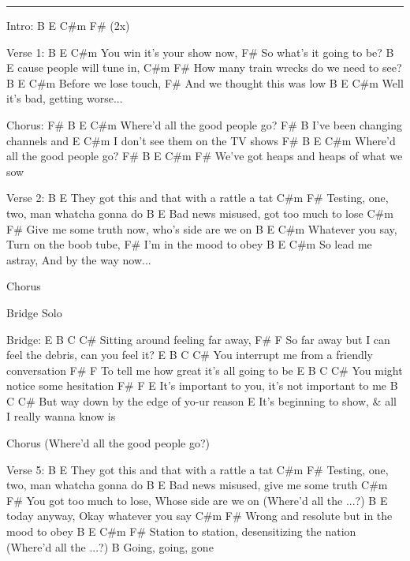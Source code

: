 \noindent\rule{\columnwidth}{1pt}

\begin{multicols}{2}
\begin{lstsong}
Intro: B  E C#m F# (2x)

Verse 1:
B        E             C#m
  You win it's your show now, 
   F#
So what's it going to be? 
B             E            
  cause people will tune in,
C#m                     F#
  How many train wrecks do we need to see? 
B       E          C#m
  Before we lose touch, 
    F#
And we thought this was low 
B           E              C#m  
  Well it's bad, getting worse...

Chorus:
F#                B       E    C#m
Where'd all the good people go?
            F#              B
I've been changing channels and
             E          C#m
I don't see them on the TV shows 
F#               B       E     C#m
Where'd all the good people go?
            F#                B   E C#m F# 
We've got heaps and heaps of what we sow 

Verse 2:
         B			E
They got this and that with a rattle a tat 
    C#m               F#
Testing, one, two, man whatcha gonna do 
    B		      E
Bad news misused, got too much to lose 
C#m			      F#
Give me some truth now, who's side are we on 
    B           E        C#m
Whatever you say, Turn on the boob tube,
F#
I'm in the mood to obey
    B           E            C#m
So lead me astray, And by the way now... 

Chorus

Bridge Solo

Bridge:
E                             B    C  C#
  Sitting around feeling far away,
        F#                          F   
So far away but I can feel the debris, can you feel it?
E                     B           C C#
 You interrupt me from a friendly conversation
           F#                             F
To tell me how great it's all going to be
E                   B         C C#
  You might notice some hesitation
                            F#            F E
It's important to you, it's not important to me
             B                          C C#
But way down by the edge of yo-ur reason
                          E
It's beginning to show, & all I really wanna know is

Chorus  (Where'd all the good people go?)


Verse 5:
         B			E
They got this and that with a rattle a tat 
    C#m               F#
Testing, one, two, man whatcha gonna do 
    B		   E
Bad news misused, give me some truth
        C#m			   F#                    
You got too much to lose,  Whose side are we on
                          (Where'd all the ...?)
   B                   E
today anyway, Okay whatever you say
C#m			       F#   
Wrong and resolute but in the mood to obey
  B           E            C#m          F#
Station to station, desensitizing the nation
                          (Where'd all the ...?)       
B
Going, going, gone
\end{lstsong}
\end{multicols}
\newpage


